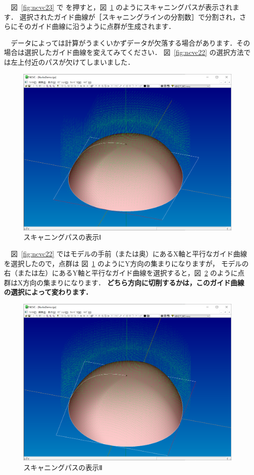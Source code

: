 　図~\ref{fig:ncvc23} で  を押すと，図~\ref{fig:ncvc24} のようにスキャニングパスが表示されます．
選択されたガイド曲線が［スキャニングラインの分割数］で分割され，さらにそのガイド曲線に沿うように点群が生成されます．

　データによっては計算がうまくいかずデータが欠落する場合があります．その場合は選択したガイド曲線を変えてみてください．
図~\ref{fig:ncvc22} の選択方法では左上付近のパスが欠けてしまいました．

\begin{figure}[H]
\centering
\includegraphics[scale=0.5]{No2/fig/fig24.png}
\caption{スキャニングパスの表示Ⅰ}
\label{fig:ncvc24}
\end{figure}

　図~\ref{fig:ncvc22} ではモデルの手前（または奥）にあるX軸と平行なガイド曲線を選択したので，点群は 図~\ref{fig:ncvc24} のようにY方向の集まりになりますが，
モデルの右（または左）にあるY軸と平行なガイド曲線を選択すると，図~\ref{fig:ncvc25} のように点群はX方向の集まりになります．
\textbf{どちら方向に切削するかは，このガイド曲線の選択によって変わります．}

\begin{figure}[H]
\centering
\includegraphics[scale=0.5]{No2/fig/fig25.png}
\caption{スキャニングパスの表示Ⅱ}
\label{fig:ncvc25}
\end{figure}

